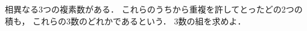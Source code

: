 \documentclass[../../main.tex]{subfiles}
\begin{document}
相異なる3つの複素数がある．
これらのうちから重複を許してとったどの2つの積も，
これらの3数のどれかであるという．
3数の組を求めよ．
\end{document}
